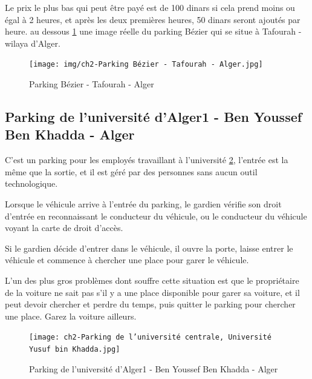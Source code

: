 Le prix le plus bas qui peut être payé est de 100 dinars si cela prend moins ou égal à 2 heures, et après les deux premières heures, 50 dinars seront ajoutés par heure. 
au dessous \ref{Bézier} une image réelle du parking Bézier qui se situe à Tafourah - wilaya d'Alger.

\begin{figure}
	\centering
	\texttt{[image: img/ch2-Parking Bézier - Tafourah - Alger.jpg]}
	\caption{Parking Bézier - Tafourah - Alger}
 \label{Bézier}
\end{figure}

\subsection{Parking de l'université d'Alger1 - Ben Youssef Ben Khadda - Alger}  



C'est un parking pour les employés travaillant à l'université \ref{Khadda}, l'entrée est la même que la sortie, et il est géré par des personnes sans aucun outil technologique.

Lorsque le véhicule arrive à l'entrée du parking, le gardien vérifie son droit d'entrée en reconnaissant le conducteur du véhicule, ou le conducteur du véhicule voyant la carte de droit d'accès.

Si le gardien décide d'entrer dans le véhicule, il ouvre la porte, laisse entrer le véhicule et commence à chercher une place pour garer le véhicule.

L'un des plus gros problèmes dont souffre cette situation est que le propriétaire de la voiture ne sait pas s'il y a une place disponible pour garer sa voiture, et il peut devoir chercher et perdre du temps, puis quitter le parking pour chercher une place. Garez la voiture ailleurs.

\begin{figure}[H]
	\centering
	\texttt{[image: ch2-Parking de l'université centrale, Université Yusuf bin Khadda.jpg]}
	\caption{Parking de l'université d'Alger1 - Ben Youssef Ben Khadda - Alger}
 \label{Khadda}
\end{figure}


